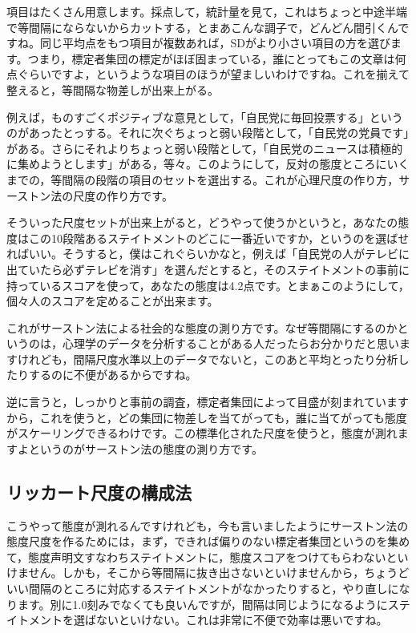 \documentclass{ltjsbook}
\begin{document}
項目はたくさん用意します。採点して，統計量を見て，これはちょっと中途半端で等間隔にならないからカットする，とまあこんな調子で，どんどん間引くんですね。同じ平均点をもつ項目が複数あれば，SDがより小さい項目の方を選びます。つまり，標定者集団の標定がほぼ固まっている，誰にとってもこの文章は何点ぐらいですよ，というような項目のほうが望ましいわけですね。これを揃えて整えると，等間隔な物差しが出来上がる。

例えば，ものすごくポジティブな意見として，「自民党に毎回投票する」というのがあったとっする。それに次ぐちょっと弱い段階として，「自民党の党員です」がある。さらにそれよりちょっと弱い段階として，「自民党のニュースは積極的に集めようとします」がある，等々。このようにして，反対の態度ところにいくまでの，等間隔の段階の項目のセットを選出する。これが心理尺度の作り方，サーストン法の尺度の作り方です。

そういった尺度セットが出来上がると，どうやって使うかというと，あなたの態度はこの10段階あるステイトメントのどこに一番近いですか，というのを選ばせればいい。そうすると，僕はこれぐらいかなと，例えば「自民党の人がテレビに出ていたら必ずテレビを消す」を選んだとすると，そのステイトメントの事前に持っているスコアを使って，あなたの態度は4.2点です。とまぁこのようにして，個々人のスコアを定めることが出来ます。

これがサーストン法による社会的な態度の測り方です。なぜ等間隔にするのかというのは，心理学のデータを分析することがある人だったらお分かりだと思いますけれども，間隔尺度水準以上のデータでないと，このあと平均とったり分析したりするのに不便があるからですね。

逆に言うと，しっかりと事前の調査，標定者集団によって目盛が刻まれていますから，これを使うと，どの集団に物差しを当てがっても，誰に当てがっても態度がスケーリングできるわけです。この標準化された尺度を使うと，態度が測れますよというのがサーストン法の態度の測り方です。

\subsection{リッカート尺度の構成法}
こうやって態度が測れるんですけれども，今も言いましたようにサーストン法の態度尺度を作るためには，まず，できれば偏りのない標定者集団というのを集めて，態度声明文すなわちステイトメントに，態度スコアをつけてもらわないといけません。しかも，そこから等間隔に抜き出さないといけませんから，ちょうどいい間隔のところに対応するステイトメントがなかったりすると，やり直しになります。別に1.0刻みでなくても良いんですが，間隔は同じようになるようにステイトメントを選ばないといけない。これは非常に不便で効率は悪いですね。
\end{document}
